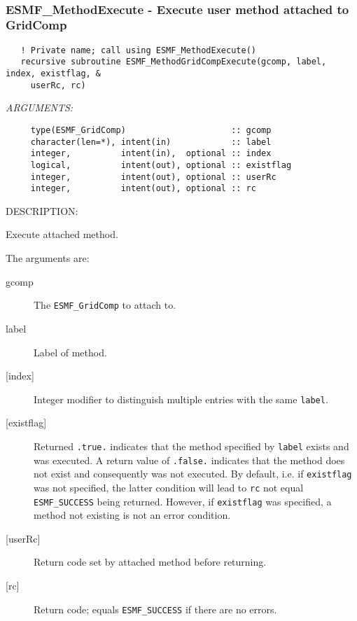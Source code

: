  
\mbox{}\hrulefill\ 
 
\subsubsection [ESMF\_MethodExecute] {ESMF\_MethodExecute - Execute user method attached to GridComp}


  
\begin{verbatim}   ! Private name; call using ESMF_MethodExecute()
   recursive subroutine ESMF_MethodGridCompExecute(gcomp, label, index, existflag, &
     userRc, rc)\end{verbatim}{\em ARGUMENTS:}
\begin{verbatim}     type(ESMF_GridComp)                     :: gcomp
     character(len=*), intent(in)            :: label
     integer,          intent(in),  optional :: index
     logical,          intent(out), optional :: existflag
     integer,          intent(out), optional :: userRc
     integer,          intent(out), optional :: rc\end{verbatim}
{\sf DESCRIPTION:\\ }


   Execute attached method.
  
   The arguments are:
   \begin{description}
   \item[gcomp]
     The {\tt ESMF\_GridComp} to attach to.
   \item[label]
     Label of method.
   \item[{[index]}]
     Integer modifier to distinguish multiple entries with the same {\tt label}.
   \item[{[existflag]}]
     Returned {\tt .true.} indicates that the method specified by {\tt label}
     exists and was executed. A return value of {\tt .false.} indicates that
     the method does not exist and consequently was not executed. By default,
     i.e. if {\tt existflag} was not specified, the latter condition will lead
     to {\tt rc} not equal {\tt ESMF\_SUCCESS} being returned. However, if
     {\tt existflag} was specified, a method not existing is not an error
     condition.
   \item[{[userRc]}]
     Return code set by attached method before returning.
   \item[{[rc]}]
     Return code; equals {\tt ESMF\_SUCCESS} if there are no errors.
   \end{description}
   
